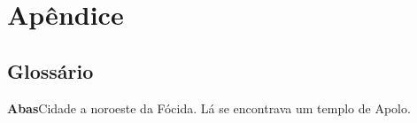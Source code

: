 \part{Apêndice} 










\chapter{Glossário}\label{glossario}

\begingroup
\parskip3pt
\parindent0pt
\small

\textbf{Abas}\quad Cidade a noroeste da Fócida. Lá se encontrava um
templo de Apolo.


